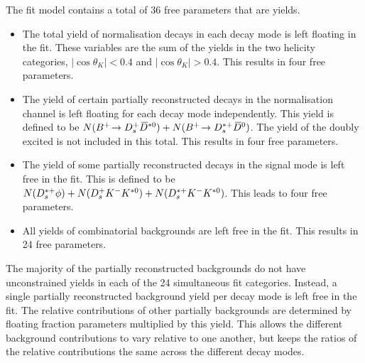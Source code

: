 
The fit model contains a total of 36 free parameters that are yields.
\begin{itemize}
\item The total yield of normalisation decays in each \Dsp decay mode is left floating in the fit. These variables are the sum of the yields in the two helicity categories, $|\cos\theta_{K}| < 0.4$ and $|\cos\theta_{K}| > 0.4$. This results in four free parameters.
\item The yield of certain partially reconstructed decays in the normalisation channel is left floating for each \Dsp decay mode independently. This yield is defined to be $N({{{B}^+}}\!\rightarrow {\ensuremath{{D}^+_{s}}}{\ensuremath{{\kern 0.2em\overline{\kern -0.2em D}{}}{}^{*0}}})+ N({{{B}^+}}\!\rightarrow {\ensuremath{{D}^{*+}_{s}}}{\ensuremath{{\kern 0.2em\overline{\kern -0.2em D}{}}{}^0}})$. The yield of the doubly excited \decay{\Bp}{\Dssp\Dstarzb} is not included in this total. This results in four free parameters.
\item The yield of some partially reconstructed decays in the signal mode is left free in the fit. This is defined to be $N({{D}^{*+}_{s}}\phi) + N({{D}^+_{s}}{{K}^-}{{K}^{*0}}) + N({{D}^{*+}_{s}}{{K}^-}{{K}^{*0}})$. This leads to four free parameters. 
\item All yields of combinatorial backgrounds are left free in the fit. This results in 24 free parameters.
\end{itemize}







The majority of the partially reconstructed backgrounds do not have unconstrained yields in each of the 24 simultaneous fit categories. 
Instead, a single partially reconstructed background yield per \Dsp decay mode is left free in the fit. The relative contributions of other partially backgrounds are determined by floating fraction parameters multiplied by this yield. 
This allows the different background contributions to vary relative to one another, but keeps the ratios of the relative contributions the same across the different \Dsp decay modes.

